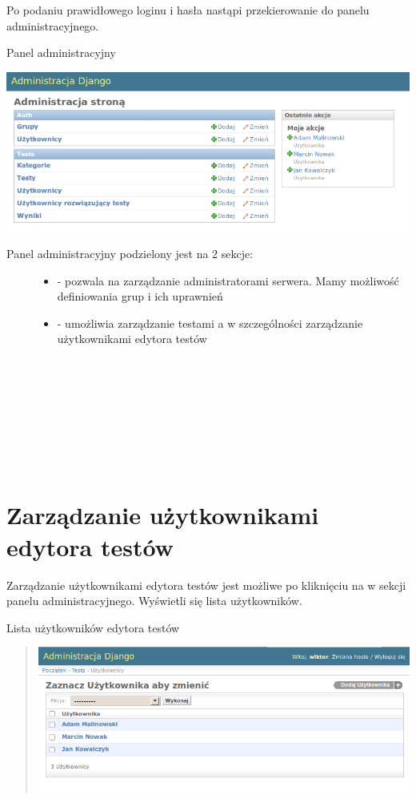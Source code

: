 \documentclass[letterpaper,10pt,polish]{sphinxmanual}
\begin{document}
Po podaniu prawidłowego loginu i hasła nastąpi przekierowanie do panelu administracyjnego.

Panel administracyjny

\includegraphics{Administracja.png}
\begin{description}
\item[{Panel administracyjny podzielony jest na 2 sekcje:}] \leavevmode\begin{itemize}
\item {} 
 - pozwala na zarządzanie administratorami serwera. Mamy możliwość definiowania grup i ich uprawnień

\item {} 
 - umożliwia zarządzanie testami a w szczególności zarządzanie użytkownikami edytora testów

\end{itemize}

\end{description}
{\raggedright{}~\\
~\\
~\\
~\\
~\\
~\\
~}


\section{Zarządzanie użytkownikami edytora testów}
\label{index:zarzadzanie-uzytkownikami}\label{index:zarzadzanie-uzytkownikami-edytora-testow}
Zarządzanie użytkownikami edytora testów jest możliwe po kliknięciu na  w sekcji  panelu administracyjnego. Wyświetli się lista użytkowników.

Lista użytkowników edytora testów
\begin{quote}

\includegraphics{ListaUzytkownikow.png}
\end{quote}
\end{document}
